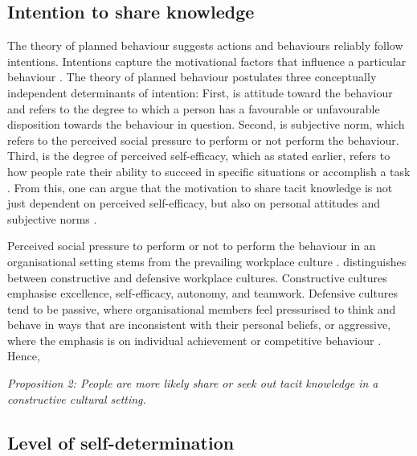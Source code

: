 \subsection{Intention to share knowledge}

The theory of planned behaviour suggests actions and behaviours reliably follow intentions. Intentions capture the motivational factors that influence a particular behaviour \citep{ajzen1985intentions}. The theory of planned behaviour postulates three conceptually independent determinants of intention: First, is attitude toward the behaviour and refers to the degree to which a person has a favourable or unfavourable disposition towards the behaviour in question. Second, is subjective norm, which refers to the perceived social pressure to perform or not perform the behaviour. Third, is the degree of perceived self-efficacy, which as stated earlier, refers to how people rate their ability to succeed in specific situations or accomplish a task \citep{bandura1977self,bandura1982self,ajzen1991theory}. From this, one can argue that the motivation to share tacit knowledge is not just dependent on perceived self-efficacy, but also on personal attitudes and subjective norms \citep{gagne2009model,chen2012behavioral}. \medskip

Perceived social pressure to perform or not to perform the behaviour in an organisational setting stems from the prevailing workplace culture \citep{papadopoulos2013exploring}. \citet{cooke1988behavioral} distinguishes between constructive and defensive workplace cultures. Constructive cultures emphasise excellence, self-efficacy, autonomy, and teamwork. Defensive cultures tend to be passive, where organisational members feel pressurised to think and behave in ways that are inconsistent with their personal beliefs, or aggressive, where the emphasis is on individual achievement or competitive behaviour \citep{cooke1988behavioral}. Hence,  \medskip

\begin{tcolorbox}
\emph{Proposition 2: People are more likely share or seek out tacit knowledge in a constructive cultural setting.}
\end{tcolorbox}

\subsection{Level of self-determination}


